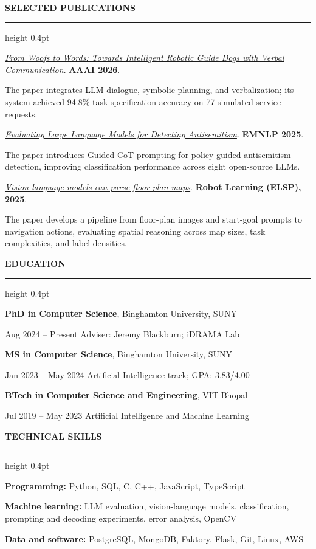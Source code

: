 \documentclass[11pt,letterpaper]{article}
\newcommand{\resumesection}[1]{%
  \par\vspace{9pt}
  {\normalsize\bfseries #1}\par\vspace{3pt}
  \hrule height 0.4pt\vspace{5pt}
}
\begin{document}
\resumesection{SELECTED PUBLICATIONS}

\href{https://ojs.aaai.org/index.php/AAAI/article/view/41198}{\textit{From Woofs to Words: Towards Intelligent Robotic Guide Dogs with Verbal Communication}}.
\textbf{AAAI 2026}.\par
The paper integrates LLM dialogue, symbolic planning, and verbalization; its system achieved
94.8\% task-specification accuracy on 77 simulated service requests.\par
\vspace{5pt}
\href{https://aclanthology.org/2025.emnlp-main.1792/}{\textit{Evaluating Large Language Models for Detecting Antisemitism}}.
\textbf{EMNLP 2025}.\par
The paper introduces Guided-CoT prompting for policy-guided antisemitism detection,
improving classification performance across eight open-source LLMs.\par
\vspace{5pt}
\href{https://www.elspub.com/doi/10.55092/rl20250011}{\textit{Vision language models can parse floor plan maps}}.
\textbf{Robot Learning (ELSP), 2025}.\par
The paper develops a pipeline from floor-plan images and start-goal prompts to navigation
actions, evaluating spatial reasoning across map sizes, task complexities, and label densities.\par

\resumesection{EDUCATION}

\textbf{PhD in Computer Science}, Binghamton University, SUNY\par
Aug 2024 -- Present \textbar{} Adviser: Jeremy Blackburn; iDRAMA Lab\par
\vspace{5pt}
\textbf{MS in Computer Science}, Binghamton University, SUNY\par
Jan 2023 -- May 2024 \textbar{} Artificial Intelligence track; GPA: 3.83/4.00\par
\vspace{5pt}
\textbf{BTech in Computer Science and Engineering}, VIT Bhopal\par
Jul 2019 -- May 2023 \textbar{} Artificial Intelligence and Machine Learning\par

\resumesection{TECHNICAL SKILLS}

\textbf{Programming:} Python, SQL, C, C++, JavaScript, TypeScript\par
\vspace{3pt}
\textbf{Machine learning:} LLM evaluation, vision-language models, classification,
prompting and decoding experiments, error analysis, OpenCV\par
\vspace{3pt}
\textbf{Data and software:} PostgreSQL, MongoDB, Faktory, Flask, Git, Linux, AWS\par
\end{document}
